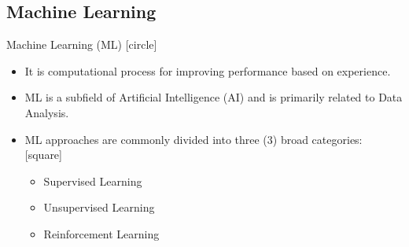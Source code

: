 \subsection{Machine Learning}\label{subsec:machine-learning}

\begin{frame}{Machine Learning (ML)}
    [circle]
    \begin{itemize}
        \item{It is computational process for improving performance based on experience.}
        \vspace{0.3cm}
        \item{ML is a subfield of Artificial Intelligence (AI) and is primarily related to Data Analysis.}
        \vspace{0.3cm}
        \item{ML approaches are commonly divided into three ($3$) broad categories:
        [square]
        \begin{itemize}
            \item Supervised Learning %
            \item Unsupervised Learning %
            \item Reinforcement Learning %
        \end{itemize}
        }
    \end{itemize}
\end{frame}

